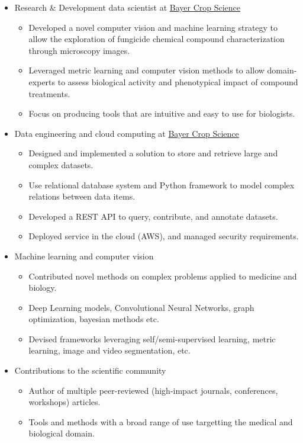 \documentclass[12pt,a4paper]{awesome-cv}
\begin{document}
\begin{cvparagraph}
\begin{itemize}
\item Research \& Development data scientist at \href{https://www.bayer.com/en/agriculture}{Bayer Crop Science}
\begin{itemize}
\item Developed a novel computer vision and machine learning strategy to allow the exploration of fungicide chemical compound characterization through microscopy images.
\item Leveraged metric learning and computer vision methods to allow domain-experts to assess biological activity and phenotypical impact of compound treatments.
\item Focus on producing tools that are intuitive and easy to use for biologists.
\end{itemize}
\item Data engineering and cloud computing at \href{https://www.bayer.com/en/agriculture}{Bayer Crop Science}
\begin{itemize}
\item Designed and implemented a solution to store and retrieve large and complex datasets.
\item Use relational database system and Python framework to model complex relations between data items.
\item Developed a REST API to query, contribute, and annotate datasets.
\item Deployed service in the cloud (AWS), and managed security requirements.
\end{itemize}
\item Machine learning and computer vision
\begin{itemize}
\item Contributed novel methods on complex problems applied to medicine and biology.
\item Deep Learning models, Convolutional Neural Networks, graph optimization, bayesian methods etc.
\item Devised frameworks leveraging self/semi-supervised learning, metric learning, image and video segmentation, etc.
\end{itemize}
\item Contributions to the scientific community
\begin{itemize}
\item Author of multiple peer-reviewed (high-impact journals, conferences, workshops) articles.
\item Tools and methods with a broad range of use targetting the medical and biological domain.
\end{itemize}
\end{itemize}


\end{cvparagraph}
\label{sec:orgfcd52a6}
\end{document}
